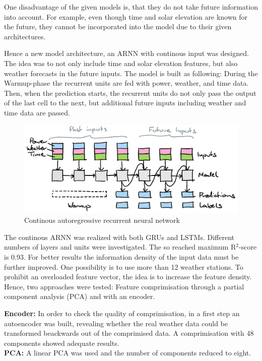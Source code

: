 \documentclass[11pt,table]{article}
\begin{document}
One disadvantage of the given models is, that they do not take future information into account. For example, even though time and solar elevation are known for the future, they cannot be incorporated into the model due to their given architectures.

Hence a new model architecture, an ARNN with continous input was designed. The idea was to not only include time and solar elevation features, but also weather forecasts in the future inputs. The model is built as following: During the Warmup-phase the recurrent units are fed with power, weather, and time data. Then, when the prediction starts, the recurrent units do not only pass the output of the last cell to the next, but additional future inputs including weather and time data are passed.
 
\begin{figure}[H]
	\centering
	\includegraphics[scale=1]{Figures/continousARNN.png}
	\caption{Continous autoregressive recurrent neural network}
	\label{fig:continousARNN}
\end{figure}

The continous ARNN was realized with both GRUs and LSTMs. Different numbers of layers and units were investigated. The so reached maximum R$^2$-score is 0.93. For better results the information density of the input data must be further improved. One possibility is to use more than 12 weather stations. To prohibit an overloaded feature vector, the idea is to increase the feature density. Hence, two approaches were tested: Feature comprimisation through a partial component analysis (PCA) and with an encoder.

\textbf{Encoder:}
In order to check the quality of comprimisation, in a first step an autoencoder was built, revealing whether the real weather data could be transformed beackwards out of the comprimised data. A comprimisation with 48 components showed adequate results.\\

\textbf{PCA:}
A linear PCA was used and the number of components reduced to eight.\\
\end{document}
